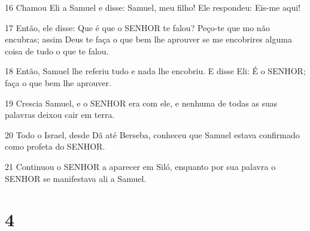 \par 16 Chamou Eli a Samuel e disse: Samuel, meu filho! Ele respondeu: Eis-me aqui!
\par 17 Então, ele disse: Que é que o SENHOR te falou? Peço-te que mo não encubras; assim Deus te faça o que bem lhe aprouver se me encobrires alguma coisa de tudo o que te falou.
\par 18 Então, Samuel lhe referiu tudo e nada lhe encobriu. E disse Eli: É o SENHOR; faça o que bem lhe aprouver.
\par 19 Crescia Samuel, e o SENHOR era com ele, e nenhuma de todas as suas palavras deixou cair em terra.
\par 20 Todo o Israel, desde Dã até Berseba, conheceu que Samuel estava confirmado como profeta do SENHOR.
\par 21 Continuou o SENHOR a aparecer em Siló, enquanto por sua palavra o SENHOR se manifestava ali a Samuel.

\chapter{4}

